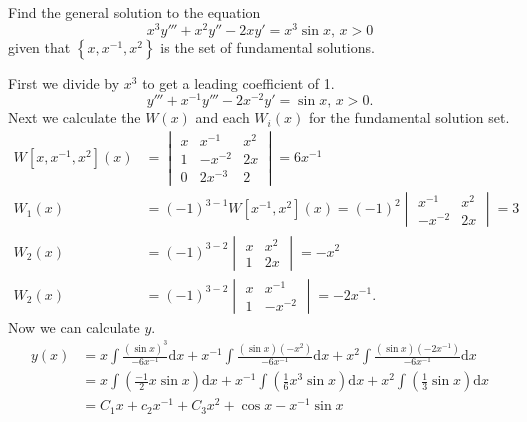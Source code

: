 \begin{example}
	Find the general solution to the equation
	\begin{equation*}
		x^3y''' + x^2y'' - 2xy' = x^3\sin{x} \text{, } x > 0
	\end{equation*}
	given that $\left\{x, x^{-1}, x^2\right\}$ is the set of fundamental solutions.
\end{example}
\noindent
First we divide by $x^3$ to get a leading coefficient of 1.
\begin{equation*}
	y''' + x^{-1}y''' - 2x^{-2}y' = \sin{x} \text{, } x > 0.
\end{equation*}
Next we calculate the $W(x)$ and each $W_i(x)$ for the fundamental solution set.
\begin{align*}
	W[x,x^{-1}, x^2](x) &= \begin{vmatrix}
		x & x^{-1} & x^2 \\
		1 & -x^{-2} & 2x \\
		0 & 2x^{-3} & 2
	\end{vmatrix} = 6x^{-1} \\
	W_1(x) &= (-1)^{3-1}W[x^{-1}, x^2](x) = (-1)^{2}\begin{vmatrix}
		x^{-1} & x^2 \\
		-x^{-2} & 2x
	\end{vmatrix} = 3 \\
	W_2(x) &= (-1)^{3-2}\begin{vmatrix}
		x & x^{2} \\
		1 & 2x
	\end{vmatrix} = -x^2 \\
	W_2(x) &= (-1)^{3-2}\begin{vmatrix}
		x & x^{-1} \\
		1 & -x^{-2}
	\end{vmatrix} = -2x^{-1}.
\end{align*}
Now we can calculate $y$.
\begin{align*}
	y(x) &= x\int{\frac{(\sin{x})^3}{-6x^{-1}} \mathrm{d}x} + x^{-1}\int{\frac{(\sin{x})(-x^2)}{-6x^{-1}} \mathrm{d}x} + x^2\int{\frac{(\sin{x})(-2x^{-1})}{-6x^{-1}} \mathrm{d}x} \\
	&= x\int{\left(\frac{-1}{2}x\sin{x}\right)\mathrm{d}x} + x^{-1}\int{\left(\frac{1}{6}x^3\sin{x}\right)\mathrm{d}x} + x^2\int{\left(\frac{1}{3}\sin{x}\right)\mathrm{d}x} \\
	&= C_1x + c_2x^{-1} + C_3x^2 + \cos{x} - x^{-1}\sin{x}
\end{align*}